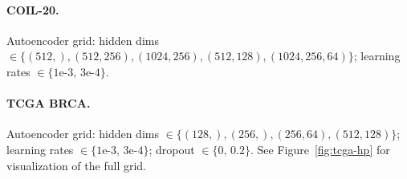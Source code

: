 \documentclass[11pt]{article}
\begin{document}
\paragraph{COIL-20.} Autoencoder grid: hidden dims $\in \{(512,), (512,256), (1024,256), (512,128), (1024,256,64)\}$; learning rates $\in \{1\text{e-}3,\, 3\text{e-}4\}$.

\paragraph{TCGA BRCA.} Autoencoder grid: hidden dims $\in \{(128,), (256,), (256,64), (512,128)\}$; learning rates $\in \{1\text{e-}3,\, 3\text{e-}4\}$; dropout $\in \{0,\, 0.2\}$. See Figure~\ref{fig:tcga-hp} for visualization of the full grid.
\end{document}
